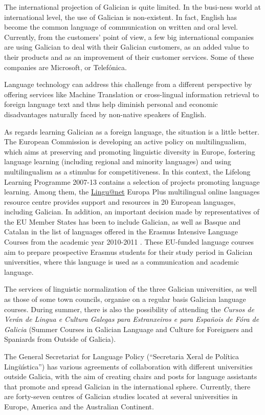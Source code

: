 \begin{multicols}{2}
\begin{itemize}
\begin{multicols}{2}
The international projection of Galician is quite limited. In the busi-ness world at international level, the use of Galician is non-existent. In fact, English has become the common language of communication on written and oral level. Currently, from the customers' point of view, a few big international companies are using Galician to deal with their Galician customers, as an added value to their products and as an improvement of their customer services. Some of these companies are Microsoft, or Telefónica.

Language technology can address this challenge from a different perspective by offering services like Machine Translation or cross-lingual information retrieval to foreign language text and thus help diminish personal and economic disadvantages naturally faced by non-native speakers of English.

As regards learning Galician as a foreign language, the situation is a little better. The European Commission is developing an active policy on multilingualism, which aims at preserving and promoting linguistic diversity in Europe, fostering language learning (including regional and minority languages) and using multilingualism as a stimulus for competitiveness. In this context, the Lifelong Learning Programme 2007-13 contains a selection of projects promoting language learning. Among them, the \uline{Lingu@net} Europa Plus multilingual online languages resource centre \cite{GAL-Nota14} provides support and resources in 20 European languages, including Galician. In addition, an important decision made by representatives of the EU Member States has been to include Galician, as well as Basque and Catalan in the list of languages offered in the Erasmus Intensive Language Courses from the academic year 2010-2011 \cite{GAL-Nota15}. These EU-funded language courses aim to prepare prospective Erasmus students for their study period in Galician universities, where this language is used as a communication and academic language.

The services of linguistic normalization of the three Galician universities, as well as those of some town councils, organise on a regular basis Galician language courses. During summer, there is also the possibility of attending the \textit{Cursos de Verán de Lingua e Cultura Galegas para Estranxeiros e para Españois de Fóra de Galicia} (Summer Courses in Galician Language and Culture for Foreigners and Spaniards from Outside of Galicia).

The General Secretariat for Language Policy (“Secretaria Xeral de Política Lingüística”) has various agreements of collaboration with different universities outside Galicia, with the aim of creating chairs and posts for language assistants that promote and spread Galician in the international sphere. Currently, there are forty-seven centres of Galician studies located at several universities in Europe, America and the Australian Continent.


\end{multicols}
\end{itemize}
\end{multicols}
